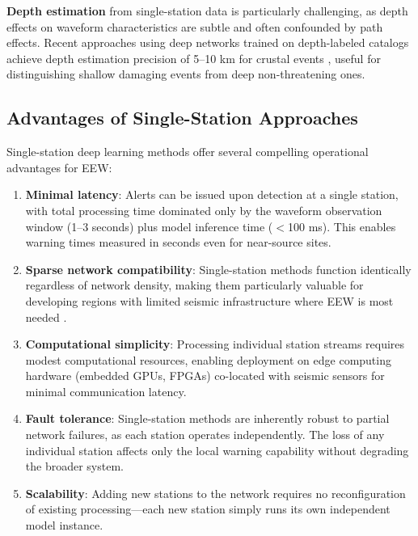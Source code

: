 \documentclass[review,authoryear]{elsarticle}
\begin{document}
\textbf{Depth estimation} from single-station data is particularly challenging, as depth effects on waveform characteristics are subtle and often confounded by path effects. Recent approaches using deep networks trained on depth-labeled catalogs achieve depth estimation precision of 5--10 km for crustal events \citep{jannes2024deep}, useful for distinguishing shallow damaging events from deep non-threatening ones.

\subsection{Advantages of Single-Station Approaches}

Single-station deep learning methods offer several compelling operational advantages for EEW:

\begin{enumerate}
\item \textbf{Minimal latency}: Alerts can be issued upon detection at a single station, with total processing time dominated only by the waveform observation window (1--3 seconds) plus model inference time ($<$100 ms). This enables warning times measured in seconds even for near-source sites.

\item \textbf{Sparse network compatibility}: Single-station methods function identically regardless of network density, making them particularly valuable for developing regions with limited seismic infrastructure where EEW is most needed \citep{allen2019earthquake}.

\item \textbf{Computational simplicity}: Processing individual station streams requires modest computational resources, enabling deployment on edge computing hardware (embedded GPUs, FPGAs) co-located with seismic sensors for minimal communication latency.

\item \textbf{Fault tolerance}: Single-station methods are inherently robust to partial network failures, as each station operates independently. The loss of any individual station affects only the local warning capability without degrading the broader system.

\item \textbf{Scalability}: Adding new stations to the network requires no reconfiguration of existing processing---each new station simply runs its own independent model instance.
\end{enumerate}
\end{document}
